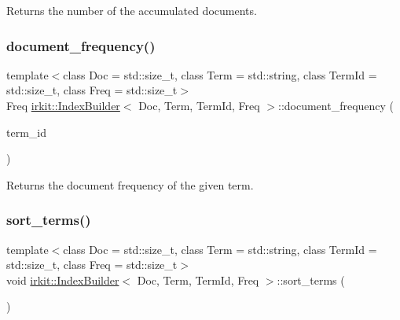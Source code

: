 Returns the number of the accumulated documents. 

\mbox{\label{classirkit_1_1IndexBuilder_ac4c8613d07637de4b67d61df2910bbd0}} 
\subsubsection{\texorpdfstring{document\+\_\+frequency()}{document\_frequency()}}
{\footnotesize\ttfamily template$<$class Doc  = std\+::size\+\_\+t, class Term  = std\+::string, class Term\+Id  = std\+::size\+\_\+t, class Freq  = std\+::size\+\_\+t$>$ \\
Freq \hyperlink{classirkit_1_1IndexBuilder}{irkit\+::\+Index\+Builder}$<$ Doc, Term, Term\+Id, Freq $>$\+::document\+\_\+frequency (\begin{DoxyParamCaption}\item[{Term\+Id}]{term\+\_\+id }\end{DoxyParamCaption})\hspace{0.3cm}{\ttfamily [inline]}}



Returns the document frequency of the given term. 

\mbox{\label{classirkit_1_1IndexBuilder_a242138da460b9853fc6aebb5b8c59c86}} 
\subsubsection{\texorpdfstring{sort\+\_\+terms()}{sort\_terms()}}
{\footnotesize\ttfamily template$<$class Doc  = std\+::size\+\_\+t, class Term  = std\+::string, class Term\+Id  = std\+::size\+\_\+t, class Freq  = std\+::size\+\_\+t$>$ \\
void \hyperlink{classirkit_1_1IndexBuilder}{irkit\+::\+Index\+Builder}$<$ Doc, Term, Term\+Id, Freq $>$\+::sort\+\_\+terms (\begin{DoxyParamCaption}{ }\end{DoxyParamCaption})\hspace{0.3cm}{\ttfamily [inline]}}



